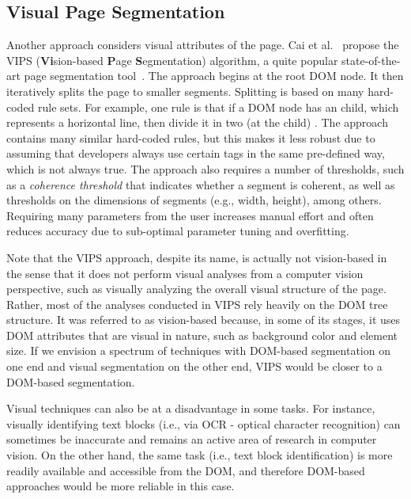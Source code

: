 \subsection{Visual Page Segmentation}
Another approach considers visual attributes of the page.
Cai et al.~\cite{cai2003vips} propose
the VIPS (\textbf{Vi}sion-based \textbf{P}age \textbf{S}egmentation)
algorithm, a quite popular state-of-the-art page segmentation tool~\cite{sleiman2013survey, campus2011web}.
The approach begins at the root DOM node.
It then iteratively splits the page to smaller segments.
Splitting is based on many hard-coded rule sets.
For example, one rule is that if a DOM node has an  child, 
which represents a horizontal line,
then divide it in two (at the  child) . 
The approach contains many similar hard-coded rules, 
but this makes it less robust due to assuming that developers always 
use certain tags in the same pre-defined way, which is not always true.
The approach also requires a number of thresholds,
such as a \emph{coherence threshold} that indicates whether a segment is coherent,
as well as thresholds on the dimensions of segments (e.g., width, height), among others.
Requiring many parameters from the user increases manual effort and 
often reduces accuracy due to sub-optimal parameter tuning and overfitting.

Note that the VIPS approach, despite its name, is actually not vision-based
in the sense that it does not perform visual analyses
from a computer vision perspective,
such as visually analyzing the overall visual structure of the page.
Rather, most of the analyses conducted in VIPS rely heavily on the DOM tree structure.
It was referred to as vision-based because, in some of its stages,
it uses DOM attributes that are visual in nature,
such as background color and element size.
If we envision a spectrum of techniques with DOM-based segmentation on one end
and visual segmentation on the other end, VIPS would be closer to a
DOM-based segmentation.

Visual techniques can also be at a disadvantage in some tasks. For instance, visually identifying
text blocks (i.e., via OCR - optical character recognition) can sometimes be 
inaccurate and remains an active area of research in computer vision.
On the other hand, the same task (i.e., text block identification) 
is more readily available and accessible from the DOM, 
and therefore DOM-based approaches would be more reliable in this case. 

